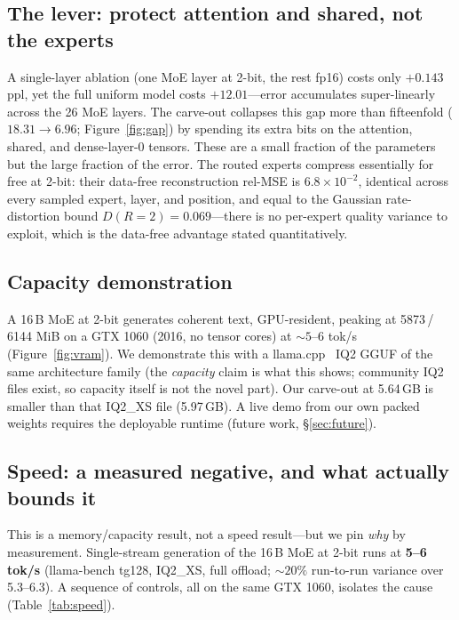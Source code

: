 \documentclass[10pt]{article}
\begin{document}
\subsection{The lever: protect attention and shared, not the experts}\label{sec:lever}
A single-layer ablation (one MoE layer at 2-bit, the rest fp16) costs only $+0.143$ ppl, yet the full
uniform model costs $+12.01$---error accumulates super-linearly across the 26 MoE layers. The carve-out
collapses this gap more than fifteenfold ($18.31\to6.96$; Figure~\ref{fig:gap}) by spending its extra bits on the
attention, shared, and dense-layer-0 tensors. These are a small fraction of the parameters but the large
fraction of the error. The routed experts compress essentially for free at 2-bit: their data-free
reconstruction rel-MSE is $6.8\times10^{-2}$, identical across every sampled expert, layer, and position,
and equal to the Gaussian rate-distortion bound $D(R{=}2)=0.069$---there is no per-expert quality
variance to exploit, which is the data-free advantage stated quantitatively.

\subsection{Capacity demonstration}\label{sec:capacity}
A 16\,B MoE at 2-bit generates coherent text, GPU-resident, peaking at 5873\,/\,6144 MiB on a GTX 1060
(2016, no tensor cores) at ${\sim}5$--$6$ tok/s (Figure~\ref{fig:vram}). We demonstrate this with a
llama.cpp~\cite{llamacpp} IQ2 GGUF of the same architecture family (the \emph{capacity} claim is what
this shows; community IQ2 files exist, so capacity itself is not the novel part). Our carve-out at
5.64\,GB is smaller than that IQ2\_XS file (5.97\,GB). A live demo from our own packed weights requires
the deployable runtime (future work, \S\ref{sec:future}).

\subsection{Speed: a measured negative, and what actually bounds it}\label{sec:speed}
This is a memory/capacity result, not a speed result---but we pin \emph{why} by measurement.
Single-stream generation of the 16\,B MoE at 2-bit runs at \textbf{5--6 tok/s} (llama-bench tg128, IQ2\_XS, full
offload; ${\sim}20\%$ run-to-run variance over 5.3--6.3). A sequence of controls, all on the same GTX 1060, isolates the cause (Table~\ref{tab:speed}).
\end{document}
